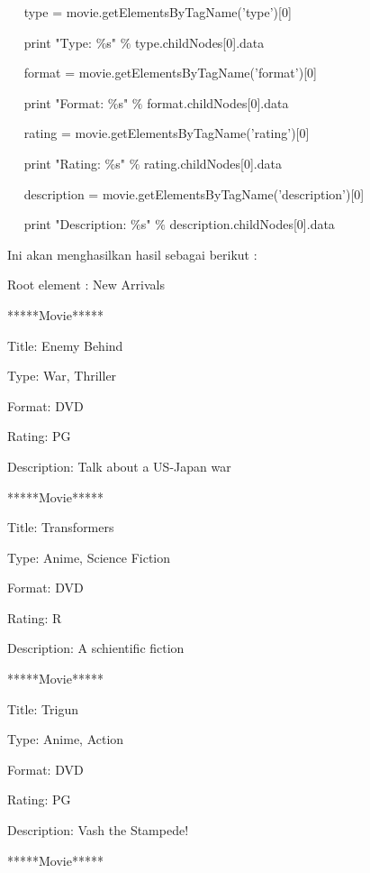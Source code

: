 \noindent 
~~ type = movie.getElementsByTagName('type')[0] \par
\noindent 
~~ print "Type:  $  \%  $s"  $  \%  $ type.childNodes[0].data \par
\noindent 
~~ format = movie.getElementsByTagName('format')[0] \par
\noindent 
~~ print "Format:  $  \%  $s"  $  \%  $ format.childNodes[0].data \par
\noindent 
~~ rating = movie.getElementsByTagName('rating')[0] \par
\noindent 
~~ print "Rating:  $  \%  $s"  $  \%  $ rating.childNodes[0].data \par
\noindent 
~~ description = movie.getElementsByTagName('description')[0] \par
\noindent 
~~ print "Description:  $  \%  $s"  $  \%  $ description.childNodes[0].data \par
\vspace{12pt}
\noindent 
Ini akan menghasilkan hasil sebagai berikut : \par
\noindent 
Root element : New Arrivals \par
\noindent 
*****Movie***** \par
\noindent 
Title: Enemy Behind \par
\noindent 
Type: War, Thriller \par
\noindent 
Format: DVD \par
\noindent 
Rating: PG \par
\noindent 
Description: Talk about a US-Japan war \par
\noindent 
*****Movie***** \par
\noindent 
Title: Transformers \par
\noindent 
Type: Anime, Science Fiction \par
\noindent 
Format: DVD \par
\noindent 
Rating: R \par
\noindent 
Description: A schientific fiction \par
\noindent 
*****Movie***** \par
\noindent 
Title: Trigun \par
\noindent 
Type: Anime, Action \par
\noindent 
Format: DVD \par
\noindent 
Rating: PG \par
\noindent 
Description: Vash the Stampede! \par
\noindent 
*****Movie***** \par
\noindent 
